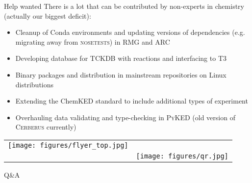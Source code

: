 \begin{frame}{Help wanted}
There is a lot that can be contributed by non-experts in chemistry (actually our biggest deficit):

\begin{itemize}
 \item Cleanup of Conda environments and updating versions of dependencies (e.g. migrating away from \textsc{nosetests}) in \textsc{RMG} and \textsc{ARC}
 \item Developing database for \textsc{TCKDB} with reactions and interfacing to \textsc{T3}
 \item Binary packages and distribution in mainstream repositories on Linux distributions
 \item Extending the ChemKED standard to include additional types of experiment
 \item Overhauling data validating and type-checking in \textsc{PyKED} (old version of \textsc{Cerberus} currently)
\end{itemize}

\end{frame}


\begin{frame}{}
\vspace{-8mm}
\centering
\begin{tabular}{cc}
	\texttt{[image: figures/flyer\_top.jpg]} & \\
	& \texttt{[image: figures/qr.jpg]}
\end{tabular}


\end{frame}

\begin{frame}{Q\&A}
 
\end{frame}
